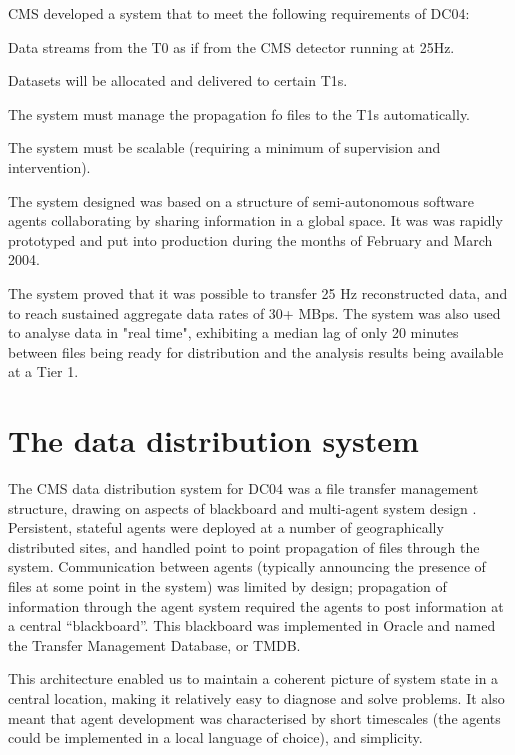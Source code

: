 \documentclass{cmspaper}
\begin{document}
CMS developed a system that to meet the following requirements of DC04:
\begin{list}{}{}
\item Data streams from the T0 as if from the CMS detector running at 25Hz.
\item Datasets will be allocated and delivered to certain T1s.
\item The system must manage the propagation fo files to the T1s automatically.
\item The system must be scalable (requiring a minimum of supervision and intervention).
\end{list}

The system designed was based on a structure of semi-autonomous software agents collaborating by sharing information in a global space. It was was rapidly prototyped and put into production during the months of February and March 2004.

The system proved that it was possible to transfer 25 Hz reconstructed data, and to reach sustained aggregate data rates of 30+ MBps. The system was also used to analyse data in "real time", exhibiting a median lag of only 20 minutes between files being ready for distribution and the analysis results being available at a Tier 1.

\section{The data distribution system}
The CMS data distribution system for DC04 was a file transfer management structure, drawing on aspects of blackboard and multi-agent system design \cite{FG96,C03,Setal03}. Persistent, stateful agents were deployed at a number of geographically distributed sites, and handled point to point propagation of files through the system. Communication between agents (typically announcing the presence of files at some point in the system) was limited by design; propagation of information through the agent system required the agents to post information at a central ``blackboard''. This blackboard was implemented in Oracle and named the Transfer Management Database, or TMDB. 

This architecture enabled us to maintain a coherent picture of system state in a central location, making it relatively easy to diagnose and solve problems. It also meant that agent development was characterised by short timescales (the agents could be implemented in a local language of choice), and simplicity. 
\end{document}
